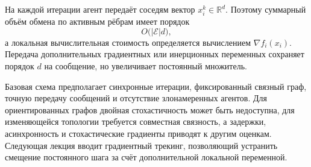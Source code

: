 На каждой итерации агент передаёт соседям вектор
\(x_i^k\in\mathbb R^d\). Поэтому суммарный объём обмена по активным
рёбрам имеет порядок
\[
    O\bigl(|\mathcal E|d\bigr),
\]
а локальная вычислительная стоимость определяется вычислением
\(\nabla f_i(x_i)\). Передача дополнительных градиентных или
инерционных переменных сохраняет порядок \(d\) на сообщение, но
увеличивает постоянный множитель.

Базовая схема предполагает синхронные итерации, фиксированный связный
граф, точную передачу сообщений и отсутствие злонамеренных агентов.
Для ориентированных графов двойная стохастичность может быть
недоступна, для изменяющейся топологии требуется совместная связность,
а задержки, асинхронность и стохастические градиенты приводят к другим
оценкам. Следующая лекция вводит градиентный трекинг, позволяющий
устранить смещение постоянного шага за счёт дополнительной локальной
переменной.
